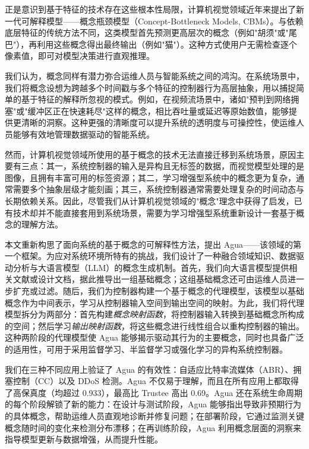 \documentclass[11pt,a4paper]{article}
\begin{document}
正是意识到基于特征的技术存在这些根本性局限，计算机视觉领域近年来提出了新一代可解释模型——概念瓶颈模型（Concept-Bottleneck Models, CBMs）。与依赖底层特征的传统方法不同，这类模型首先预测更高层次的概念（例如"胡须"或"尾巴"），再利用这些概念得出最终输出（例如"猫"）。这种方式使用户无需检查逐个像素值，即可对模型决策进行直观推理。

我们认为，概念同样有潜力弥合运维人员与智能系统之间的鸿沟。在系统场景中，我们将概念设想为跨越多个时间戳与多个特征的控制器行为高层抽象，用以捕捉简单的基于特征的解释所忽视的模式。例如，在视频流场景中，诸如"预判到网络拥塞"或"缓冲区正在快速耗尽"这样的概念，相比吞吐量或延迟等原始数值，能够提供更清晰的洞察。这种更强的清晰度可以提升系统的透明度与可操控性，使运维人员能够有效地管理数据驱动的智能系统。

然而，计算机视觉领域所使用的基于概念的技术无法直接迁移到系统场景，原因主要有三点：其一，系统控制器的输入是异构且无标签的数据，而视觉模型处理的是图像，且拥有丰富可用的标签资源；其二，学习增强型系统中的概念更为复杂，通常需要多个抽象层级才能刻画；其三，系统控制器通常需要处理复杂的时间动态与长期依赖关系。因此，尽管我们从计算机视觉领域的"概念"理念中获得了启发，已有技术却并不能直接套用到系统场景，需要为学习增强型系统重新设计一套基于概念的理解方法。

本文重新构思了面向系统的基于概念的可解释性方法，提出 Agua——该领域的第一个框架。为应对系统环境所特有的挑战，我们设计了一种融合领域知识、数据驱动分析与大语言模型（LLM）的概念生成机制。首先，我们向大语言模型提供相关文献或设计文档，据此推导出一组基础概念；这组基础概念还可由运维人员进一步扩充或过滤。随后，我们为控制器构建一个基于概念的代理模型，该模型以基础概念作为中间表示，学习从控制器输入空间到输出空间的映射。为此，我们将代理模型拆分为两部分：首先构建\emph{概念映射函数}，将控制器输入转换到基础概念所构成的空间；然后学习\emph{输出映射函数}，将这些概念进行线性组合以重构控制器的输出。这种两阶段的代理模型使 Agua 能够揭示驱动其行为的主要概念，同时也具备广泛的适用性，可用于采用监督学习、半监督学习或强化学习的异构系统控制器。

我们在三种不同应用上验证了 Agua 的有效性：自适应比特率流媒体（ABR）、拥塞控制（CC）以及 DDoS 检测。Agua 不仅易于理解，而且在所有应用上都取得了高保真度（均超过 0.933），最高比 Trustee 高出 0.69。Agua 还在系统生命周期的每个阶段解锁了新的能力：在设计与测试阶段，Agua 能够指出导致非预期行为的具体概念，帮助运维人员直观地诊断并修复问题；在部署阶段，它通过监测关键概念随时间的变化来检测分布漂移；在再训练阶段，Agua 利用概念层面的洞察来指导模型更新与数据增强，从而提升性能。
\end{document}
